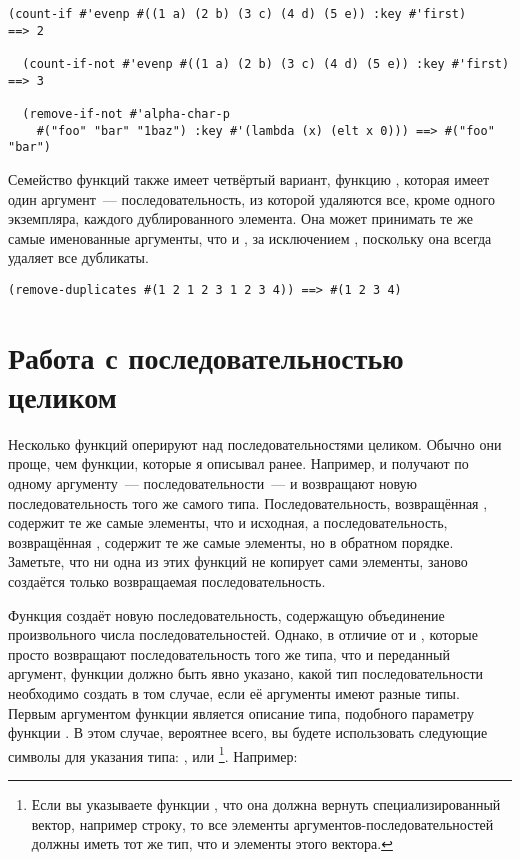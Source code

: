 \begin{lstlisting}[style=lisprepl]
  (count-if #'evenp #((1 a) (2 b) (3 c) (4 d) (5 e)) :key #'first)     ==> 2

  (count-if-not #'evenp #((1 a) (2 b) (3 c) (4 d) (5 e)) :key #'first) ==> 3

  (remove-if-not #'alpha-char-p
    #("foo" "bar" "1baz") :key #'(lambda (x) (elt x 0))) ==> #("foo" "bar")
\end{lstlisting}

Семейство функций  также имеет четвёртый вариант, функцию
, которая имеет один аргумент~--- последовательность, из которой
удаляются все, кроме одного экземпляра, каждого дублированного элемента.  Она может
принимать те же самые именованные аргументы, что и , за исключением
, поскольку она всегда удаляет все дубликаты.

\begin{lstlisting}[style=lisprepl]
  (remove-duplicates #(1 2 1 2 3 1 2 3 4)) ==> #(1 2 3 4)
\end{lstlisting}

\section{Работа с последовательностью целиком}

Несколько функций оперируют над последовательностями целиком.  Обычно
они проще, чем функции, которые я описывал ранее.  Например,
 и  получают по одному аргументу~--- последовательности~--- и
возвращают новую последовательность того же самого типа.  Последовательность, возвращённая
, содержит те же самые элементы, что и исходная,
а последовательность, возвращённая , содержит те же
самые элементы, но в обратном порядке.  Заметьте, что ни одна из этих функций не копирует
сами элементы, заново создаётся только возвращаемая последовательность.

Функция  создаёт новую последовательность, содержащую объединение произвольного
числа последовательностей.  Однако, в отличие от  и , которые
просто возвращают последовательность того же типа, что и переданный аргумент, функции
 должно быть явно указано, какой тип последовательности необходимо
создать в том случае, если её аргументы имеют разные типы.  Первым аргументом функции
является описание типа, подобного параметру  функции .
В этом случае, вероятнее всего, вы будете использовать следующие символы для указания типа:
,  или \footnote{Если вы указываете функции
  , что она должна вернуть специализированный вектор, например строку,
  то все элементы аргументов-последовательностей должны иметь тот же тип, что и элементы
  этого вектора.}.  Например:

